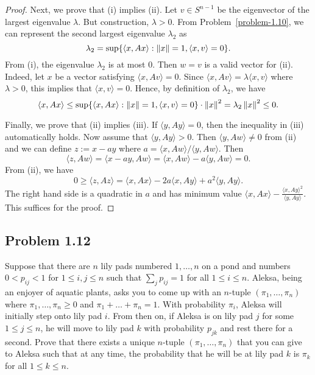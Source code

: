 \documentclass[12pt]{article}
\begin{document}
\begin{proof}
	Next, we prove that (i) implies (ii). Let $v \in S^{n-1}$ be the eigenvector of the largest eigenvalue $\lambda$. But construction, $\lambda > 0$. From Problem~\ref{problem-1.10}, we can represent the second largest eigenvalue $\lambda_2$ as 
	\[
		\lambda_2 = \sup \{ \langle x, Ax \rangle : \left\lVert x\right\rVert = 1, \langle x, v \rangle = 0\}.
	\]
	From (i), the eigenvalue $\lambda_2$ is at most $0$. Then $w = v$ is a valid vector for (ii). Indeed, let $x$ be a vector satisfying $\langle x, Av \rangle = 0$. Since $\langle x, Av \rangle = \lambda \langle x, v \rangle$ where $\lambda > 0$, this implies that $\langle x, v \rangle = 0$. Hence, by definition of $\lambda_2$, we have
	\[
		\langle x, Ax \rangle \leq \sup \{\langle x, Ax \rangle : \left\lVert x\right\rVert = 1, \langle x, v \rangle = 0 \} \cdot \left\lVert x\right\rVert^2 = \lambda_2 \left\lVert x\right\rVert^2 \leq 0.
	\]

	Finally, we prove that (ii) implies (iii). If $\langle y, Ay \rangle = 0$, then the inequality in (iii) automatically holds. Now assume that $\langle y, Ay \rangle > 0$. Then $\langle y, Aw \rangle \neq 0$ from (ii) and we can define $z := x - a y$ where $a = \langle x, Aw \rangle / \langle y, Aw \rangle$. Then 
	\[
		\langle z, Aw \rangle = \langle x - ay, Aw \rangle = \langle x, Aw \rangle - a \langle y,Aw \rangle = 0.
	\]
	From (ii), we have
	\[
		0 \geq \langle z, Az \rangle = \langle x, Ax \rangle - 2a \langle x, Ay \rangle + a^2 \langle y, Ay \rangle.
	\]
	The right hand side is a quadratic in $a$ and has minimum value $\langle x, Ax \rangle - \frac{\langle x, Ay \rangle^2}{\langle y, Ay \rangle}$. This suffices for the proof.
\end{proof}

\newpage 

\subsection{Problem 1.12}

\begin{problem} \label{problem-1.12}
	Suppose that there are $n$ lily pads numbered $1, \ldots, n$ on a pond and numbers $0 < p_{ij} < 1$ for $1 \leq i, j \leq n$ such that $\sum_j p_{ij} = 1$ for all $1 \leq i \leq n$. Aleksa, being an enjoyer of aquatic plants, asks you to come up with an $n$-tuple $(\pi_1, \ldots, \pi_n)$ where $\pi_1, \ldots, \pi_n \geq 0$ and $\pi_1 + \ldots + \pi_n = 1$. With probability $\pi_i$, Aleksa will initially step onto lily pad $i$. From then on, if Aleksa is on lily pad $j$ for some $1 \leq j \leq n$, he will move to lily pad $k$ with probability $p_{jk}$ and rest there for a second. Prove that there exists a unique $n$-tuple $(\pi_1, \ldots, \pi_n)$ that you can give to Aleksa such that at any time, the probability that he will be at lily pad $k$ is $\pi_k$ for all $1 \leq k \leq n$.
\end{problem}
\end{document}
